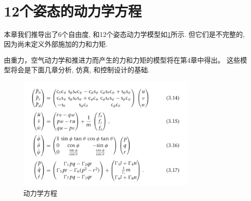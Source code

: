 \documentclass[UTF8,a4paper,10pt,nocolorlinks]{ctexart}
\begin{document}
\section{12个姿态的动力学方程}
本章我们推导出了6个自由度, 和12个姿态动力学模型如\ref{equ_7}所示. 但它们是不完整的, 因为尚未定义外部施加的力和力矩. \par 由重力，空气动力学和推进力而产生的力和力矩的模型将在第4章中得出。
这些模型将会是下面几章分析, 仿真, 和控制设计的基础. 
\begin{figure}[htpb]
  \centering
  \includegraphics[width=0.8\textwidth]{picture/equ_7.png}
  \caption{动力学方程}
  \label{equ_7}
\end{figure}
\end{document}
